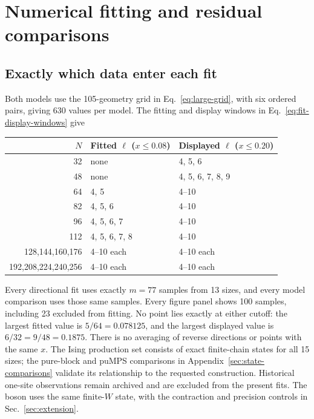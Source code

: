 \clearpage
\section{Numerical fitting and residual comparisons}
\label{sec:fits}
\subsection{Exactly which data enter each fit}
\label{sec:fit-selection}
Both models use the 105-geometry grid in Eq.~\eqref{eq:large-grid},
with six ordered pairs, giving 630 values per model. The fitting and
display windows in Eq.~\eqref{eq:fit-display-windows} give
\begin{center}
\begin{tabular}{rll}\toprule
$N$ & Fitted $\ell$ ($x\leq0.08$) & Displayed $\ell$ ($x\leq0.20$)\\\midrule
32&none&4, 5, 6\\
48&none&4, 5, 6, 7, 8, 9\\
64&4, 5&4--10\\
82&4, 5, 6&4--10\\
96&4, 5, 6, 7&4--10\\
112&4, 5, 6, 7, 8&4--10\\
128,144,160,176&4--10 each&4--10 each\\
192,208,224,240,256&4--10 each&4--10 each\\\bottomrule
\end{tabular}
\end{center}
Every directional fit uses exactly $m=77$ samples from 13 sizes, and
every model comparison uses those same samples. Every figure panel
shows 100 samples, including 23 excluded from fitting. No point lies
exactly at either cutoff: the largest fitted value is $5/64=0.078125$, and
the largest displayed value is $6/32=9/48=0.1875$. There is
no averaging of reverse directions or points with the same $x$.
The Ising production set consists of exact finite-chain states for all 15
sizes; the pure-block and puMPS comparisons in Appendix~\ref{sec:state-comparisons}
validate its relationship to the requested construction. Historical
one-site observations remain archived and are excluded from the present
fits. The boson uses the same finite-$W$ state, with the contraction
and precision controls in Sec.~\ref{sec:extension}.

